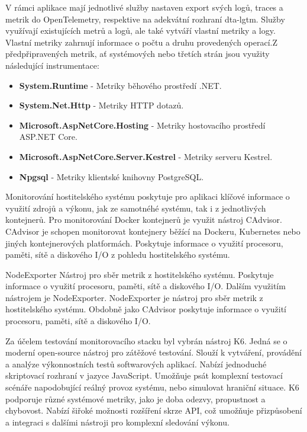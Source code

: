 V rámci aplikace mají jednotlivé služby nastaven export svých logů, traces a metrik do OpenTelemetry, respektive na adekvátní rozhraní dta-lgtm. Služby využívají existujících metrů a logů, ale také vytváří vlastní metriky a logy. 
Vlastní metriky zahrnují informace o počtu a druhu provedených operací.Z předpřipravených metrik, ať systémových nebo třetích strán jsou využity následující instrumentace:

\begin{itemize}
  \item \textbf{System.Runtime} - Metriky běhového prostředí .NET.
  \item \textbf{System.Net.Http} - Metriky HTTP dotazů.
  \item \textbf{Microsoft.AspNetCore.Hosting} - Metriky hostovacího prostředí ASP.NET Core.
  \item \textbf{Microsoft.AspNetCore.Server.Kestrel} - Metriky serveru Kestrel.
  \item \textbf{Npgsql} - Metriky klientské knihovny PostgreSQL.
\end{itemize}


Monitorování hostitelského systému poskytuje pro aplikaci klíčové informace o využití zdrojů a výkonu, jak ze samotnéhé systému, tak i z jednotlivých kontejnerů. Pro monitorování Docker kontejnerů je využit nástroj CAdvisor. CAdvisor je schopen monitorovat kontejnery běžící na Dockeru, Kubernetes nebo jiných kontejnerových platformách. Poskytuje informace o využití procesoru, paměti, sítě a diskového I/O z pohledu hostitelského systému.

NodeExporter Nástroj pro sběr metrik z hostitelského systému. Poskytuje informace o využití procesoru, paměti, sítě a diskového I/O. Dalším využitím nástrojem je NodeExporter. NodeExporter je nástroj pro sběr metrik z hostitelského systému. Obdobně jako CAdvisor poskytuje informace o využití procesoru, paměti, sítě a diskového I/O.


Za účelem testování monitorovacího stacku byl vybrán nástroj K6. Jedná se o moderní open-source nástroj pro zátěžové testování. Slouží k vytváření, provádění a analýze výkonnostních testů softwarových aplikací. Nabízí jednoduché skriptovací rozhraní v jazyce JavaScript. Umožňuje psát komplexní testovací scénáře napodobující reálný provoz systému, nebo simulovat hraniční situace. K6 podporuje různé systémové metriky, jako je doba odezvy, propustnost a chybovost. Nabízí šiřoké možnosti rozšíření skrze API, což umožňuje přizpůsobení a integraci s dalšími nástroji pro komplexní sledování výkonu.

